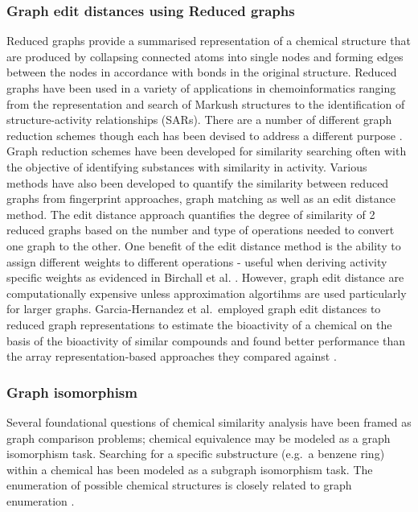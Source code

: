 \documentclass[
  super,
  preprint,
  3p]{elsarticle}
\begin{document}
\subsubsection{Graph edit distances using Reduced
graphs}\label{graph-edit-distances-using-reduced-graphs}

Reduced graphs provide a summarised representation of a chemical
structure that are produced by collapsing connected atoms into single
nodes and forming edges between the nodes in accordance with bonds in
the original structure. Reduced graphs have been used in a variety of
applications in chemoinformatics ranging from the representation and
search of Markush structures to the identification of structure-activity
relationships (SARs). There are a number of different graph reduction
schemes though each has been devised to address a different purpose
\citep{gillet_similarity_2003, birchall_reduced_2011, birchall_training_2006}.
Graph reduction schemes have been developed for similarity searching
often with the objective of identifying substances with similarity in
activity. Various methods have also been developed to quantify the
similarity between reduced graphs from fingerprint approaches, graph
matching as well as an edit distance method. The edit distance approach
quantifies the degree of similarity of 2 reduced graphs based on the
number and type of operations needed to convert one graph to the other.
One benefit of the edit distance method is the ability to assign
different weights to different operations - useful when deriving
activity specific weights as evidenced in Birchall et al.
\citep{birchall_training_2006}. However, graph edit distance are
computationally expensive unless approximation algortihms are used
particularly for larger graphs. Garcia-Hernandez et al.~employed graph
edit distances to reduced graph representations to estimate the
bioactivity of a chemical on the basis of the bioactivity of similar
compounds and found better performance than the array
representation-based approaches they compared against \citep{RN25}.

\subsubsection{Graph isomorphism}\label{graph-isomorphism}

Several foundational questions of chemical similarity analysis have been
framed as graph comparison problems; chemical equivalence may be modeled
as a graph isomorphism task. Searching for a specific substructure
(e.g.~a benzene ring) within a chemical has been modeled as a subgraph
isomorphism task. The enumeration of possible chemical structures is
closely related to graph enumeration \citep{RN22}.
\end{document}
